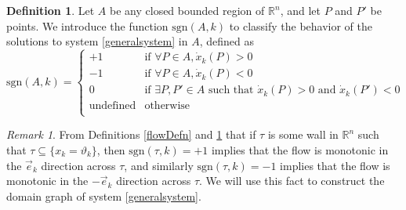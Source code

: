 \documentclass[12pt]{article}
\newtheorem{theorem}{Theorem}[section]
\theoremstyle{definition}
\newtheorem{defn}{Definition}[section]
\theoremstyle{remark}
\newtheorem{remark}{Remark}[section]
\newcommand\sgn{\text{sgn}}
\newcommand{\bbR}{\mathbb{R}} %
\begin{document}
\begin{defn} \label{sgnDefn}
Let $A$ be any closed bounded region of $\bbR^n$, and let $P$ and $P'$ be points.  We introduce the function $\sgn(A,k)$ to classify the behavior of the solutions to system \eqref{generalsystem} in $A$, defined as 
\begin{equation}
\sgn(A,k)=
\begin{cases}
+1	&	\text{if } \forall P\in A, \dot x_k (P)>0\\
-1	&	\text{if } \forall P\in A, \dot x_k (P)<0\\
0	&	\text{if } \exists P,P'\in A \text{ such that }  \dot x_k (P)>0 \text{ and } \dot x_k (P')<0\\
\text{undefined} & \text{otherwise} \\
\end{cases}
\end{equation}
\end{defn}

\begin{remark}
From Definitions \ref{flowDefn} and \ref{sgnDefn} that if $\tau$ is some wall in $\mathbb{R}^n$ such that $\tau \subseteq \{x_k=\vartheta_k\}$, then $\sgn(\tau,k)=+1$ implies that the flow is monotonic in the $\vec e_k$ direction across $\tau$, and similarly $\sgn(\tau,k)=-1$ implies that the flow is monotonic in the $-\vec e_k$ direction across $\tau$. 
We will use this fact to construct the domain graph of system \eqref{generalsystem}.
\end{remark}



\end{document}
